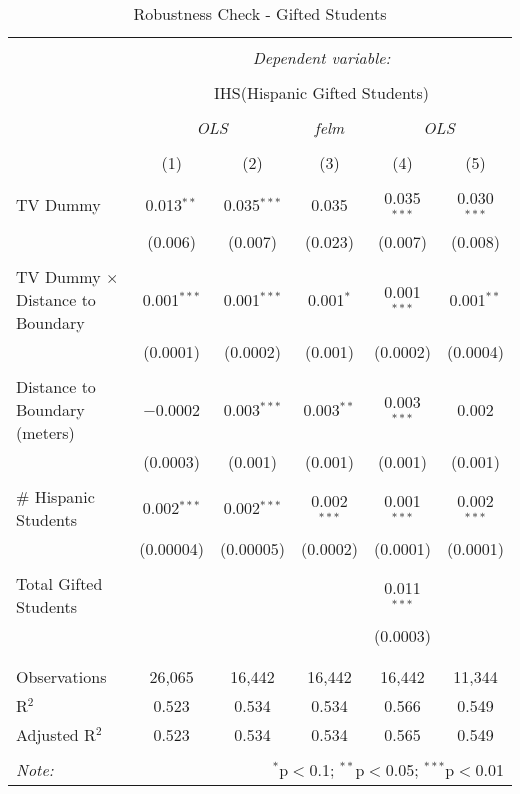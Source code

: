
\begin{table}[!htbp] \centering 
  \caption{Robustness Check - Gifted Students} 
  \label{} 
\begin{tabular}{@{\extracolsep{-2pt}}lccccc} 
\\[-1.8ex]\hline 
\hline \\[-1.8ex] 
 & \multicolumn{5}{c}{\textit{Dependent variable:}} \\ 
\cline{2-6} 
\\[-1.8ex] & \multicolumn{5}{c}{IHS(Hispanic Gifted Students)} \\ 
\\[-1.8ex] & \multicolumn{2}{c}{\textit{OLS}} & \textit{felm} & \multicolumn{2}{c}{\textit{OLS}} \\ 
\\[-1.8ex] & (1) & (2) & (3) & (4) & (5)\\ 
\hline \\[-1.8ex] 
 TV Dummy & 0.013$^{**}$ & 0.035$^{***}$ & 0.035 & 0.035$^{***}$ & 0.030$^{***}$ \\ 
  & (0.006) & (0.007) & (0.023) & (0.007) & (0.008) \\ 
  & & & & & \\ 
 TV Dummy $\times$ Distance to Boundary & 0.001$^{***}$ & 0.001$^{***}$ & 0.001$^{*}$ & 0.001$^{***}$ & 0.001$^{**}$ \\ 
  & (0.0001) & (0.0002) & (0.001) & (0.0002) & (0.0004) \\ 
  & & & & & \\ 
 Distance to Boundary (meters) & $-$0.0002 & 0.003$^{***}$ & 0.003$^{**}$ & 0.003$^{***}$ & 0.002 \\ 
  & (0.0003) & (0.001) & (0.001) & (0.001) & (0.001) \\ 
  & & & & & \\ 
 \# Hispanic Students & 0.002$^{***}$ & 0.002$^{***}$ & 0.002$^{***}$ & 0.001$^{***}$ & 0.002$^{***}$ \\ 
  & (0.00004) & (0.00005) & (0.0002) & (0.0001) & (0.0001) \\ 
  & & & & & \\ 
 Total Gifted Students &  &  &  & 0.011$^{***}$ &  \\ 
  &  &  &  & (0.0003) &  \\ 
  & & & & & \\ 
\hline \\[-1.8ex] 
Observations & 26,065 & 16,442 & 16,442 & 16,442 & 11,344 \\ 
R$^{2}$ & 0.523 & 0.534 & 0.534 & 0.566 & 0.549 \\ 
Adjusted R$^{2}$ & 0.523 & 0.534 & 0.534 & 0.565 & 0.549 \\ 
\hline 
\hline \\[-1.8ex] 
\textit{Note:}  & \multicolumn{5}{r}{$^{*}$p$<$0.1; $^{**}$p$<$0.05; $^{***}$p$<$0.01} \\ 
\end{tabular} 
\end{table} 
